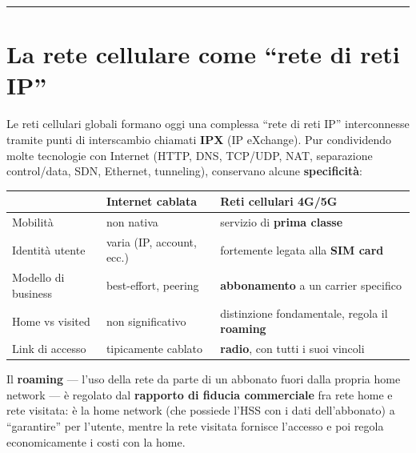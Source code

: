 \documentclass[
  italian,
  openany]{book}
\newcounter{none} %
\begin{document}
\begin{center}\rule{0.5\linewidth}{0.5pt}\end{center}

\section{La rete cellulare come ``rete di reti
IP''}\label{la-rete-cellulare-come-rete-di-reti-ip}

Le reti cellulari globali formano oggi una complessa ``rete di reti IP''
interconnesse tramite punti di interscambio chiamati \textbf{IPX} (IP
eXchange). Pur condividendo molte tecnologie con Internet (HTTP, DNS,
TCP/UDP, NAT, separazione control/data, SDN, Ethernet, tunneling),
conservano alcune \textbf{specificità}:

{\def\LTcaptype{none} %
\begin{longtable}[]{@{}
  >{\raggedright\arraybackslash}p{}
  >{\raggedright\arraybackslash}p{}
  >{\raggedright\arraybackslash}p{}@{}}
\toprule\noalign{}
\begin{minipage}[b]{\linewidth}\raggedright
\end{minipage} & \begin{minipage}[b]{\linewidth}\raggedright
\textbf{Internet cablata}
\end{minipage} & \begin{minipage}[b]{\linewidth}\raggedright
\textbf{Reti cellulari 4G/5G}
\end{minipage} \\
\midrule\noalign{}
\endhead
\bottomrule\noalign{}
\endlastfoot
Mobilità & non nativa & servizio di \textbf{prima classe} \\
Identità utente & varia (IP, account, ecc.) & fortemente legata alla
\textbf{SIM card} \\
Modello di business & best-effort, peering & \textbf{abbonamento} a un
carrier specifico \\
Home vs visited & non significativo & distinzione fondamentale, regola
il \textbf{roaming} \\
Link di accesso & tipicamente cablato & \textbf{radio}, con tutti i suoi
vincoli \\
\end{longtable}
}

Il \textbf{roaming} --- l'uso della rete da parte di un abbonato fuori
dalla propria home network --- è regolato dal \textbf{rapporto di
fiducia commerciale} fra rete home e rete visitata: è la home network
(che possiede l'HSS con i dati dell'abbonato) a ``garantire'' per
l'utente, mentre la rete visitata fornisce l'accesso e poi regola
economicamente i costi con la home.
\end{document}
